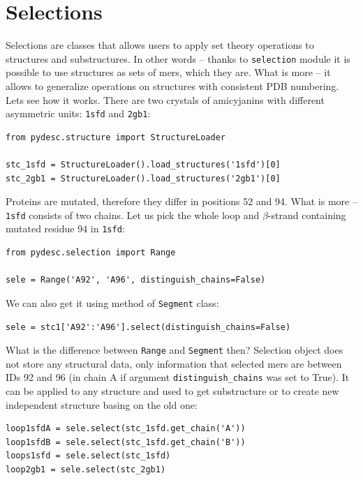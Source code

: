 \documentclass{article}
\begin{document}

\section{Selections} \label{SELEsec}

Selections are classes that allows users to apply set theory operations to structures and substructures. In other words -- thanks to \texttt{selection} module it is possible to use structures as sets of mers, which they are. What is more -- it allows to generalize operations on structures with consistent PDB numbering. Lets see how it works. There are two crystals of amicyjanins with different asymmetric units: \texttt{1sfd} and \texttt{2gb1}:

\begin{lstlisting}
from pydesc.structure import StructureLoader

stc_1sfd = StructureLoader().load_structures('1sfd')[0]
stc_2gb1 = StructureLoader().load_structures('2gb1')[0]
\end{lstlisting}

Proteins are mutated, therefore they differ in positions 52 and 94. What is more -- \texttt{1sfd} consists of two chains. Let us pick the whole loop and $\beta$-strand containing mutated residue 94 in \texttt{1sfd}:

\begin{lstlisting}
from pydesc.selection import Range

sele = Range('A92', 'A96', distinguish_chains=False)
\end{lstlisting}

We can also get it using method of \texttt{Segment} class:

\begin{lstlisting}
sele = stc1['A92':'A96'].select(distinguish_chains=False)
\end{lstlisting}

What is the difference between \texttt{Range} and \texttt{Segment} then? Selection object does not store any structural data, only information that selected mers are between IDs 92 and 96 (in chain A if argument \texttt{distinguish\_{}chains} was set to True). It can be applied to any structure and used to get substructure or to create new independent structure basing on the old one:

\begin{lstlisting}
loop1sfdA = sele.select(stc_1sfd.get_chain('A'))
loop1sfdB = sele.select(stc_1sfd.get_chain('B'))
loops1sfd = sele.select(stc_1sfd)
loop2gb1 = sele.select(stc_2gb1)
\end{lstlisting}
\end{document}
